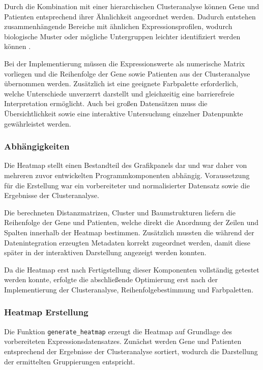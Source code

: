\documentclass[12pt]{article}
\begin{document}
Durch die Kombination mit einer hierarchischen Clusteranalyse können Gene und Patienten entsprechend ihrer Ähnlichkeit angeordnet werden. Dadurch entstehen zusammenhängende Bereiche mit ähnlichen Expressionsprofilen, wodurch biologische Muster oder mögliche Untergruppen leichter identifiziert werden können \cite{Gu2016}. 

Bei der Implementierung müssen die Expressionswerte als numerische Matrix vorliegen und die Reihenfolge der Gene sowie Patienten aus der Clusteranalyse übernommen werden. Zusätzlich ist eine geeignete Farbpalette erforderlich, welche Unterschiede unverzerrt darstellt und gleichzeitig eine barrierefreie Interpretation ermöglicht. Auch bei großen Datensätzen muss die Übersichtlichkeit sowie eine interaktive Untersuchung einzelner Datenpunkte gewährleistet werden.

\subsubsection{Abhängigkeiten}

Die Heatmap stellt einen Bestandteil des Grafikpanels dar und war daher von mehreren zuvor entwickelten Programmkomponenten abhängig. Voraussetzung für die Erstellung war ein vorbereiteter und normalisierter Datensatz sowie die Ergebnisse der Clusteranalyse.

Die berechneten Distanzmatrizen, Cluster und Baumstrukturen liefern die Reihenfolge der Gene und Patienten, welche direkt die Anordnung der Zeilen und Spalten innerhalb der Heatmap bestimmen. Zusätzlich mussten die während der Datenintegration erzeugten Metadaten korrekt zugeordnet werden, damit diese später in der interaktiven Darstellung angezeigt werden konnten.

Da die Heatmap erst nach Fertigstellung dieser Komponenten vollständig getestet werden konnte, erfolgte die abschließende Optimierung erst nach der Implementierung der Clusteranalyse, Reihenfolgebestimmung und Farbpaletten.

\subsubsection{Heatmap Erstellung}

Die Funktion \texttt{generate\_heatmap} erzeugt die Heatmap auf Grundlage des vorbereiteten Expressionsdatensatzes. Zunächst werden Gene und Patienten entsprechend der Ergebnisse der Clusteranalyse sortiert, wodurch die Darstellung der ermittelten Gruppierungen entspricht.
\end{document}
